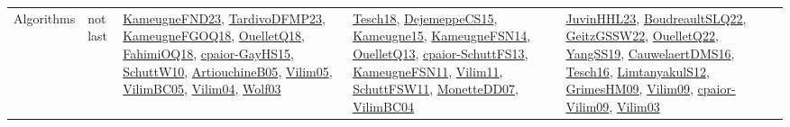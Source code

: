 {\begin{longtable}{llp{6cm}p{6cm}p{6cm}}
Algorithms & not last & \href{papers/KameugneFND23.pdf}{KameugneFND23}\cite{KameugneFND23}, \href{papers/TardivoDFMP23.pdf}{TardivoDFMP23}\cite{TardivoDFMP23}, \href{papers/KameugneFGOQ18.pdf}{KameugneFGOQ18}\cite{KameugneFGOQ18}, \href{papers/OuelletQ18.pdf}{OuelletQ18}\cite{OuelletQ18}, \href{articles/FahimiOQ18.pdf}{FahimiOQ18}\cite{FahimiOQ18}, \href{papers/cpaior-GayHS15.pdf}{cpaior-GayHS15}\cite{cpaior-GayHS15}, \href{papers/SchuttW10.pdf}{SchuttW10}\cite{SchuttW10}, \href{papers/ArtiouchineB05.pdf}{ArtiouchineB05}\cite{ArtiouchineB05}, \href{papers/Vilim05.pdf}{Vilim05}\cite{Vilim05}, \href{articles/VilimBC05.pdf}{VilimBC05}\cite{VilimBC05}, \href{papers/Vilim04.pdf}{Vilim04}\cite{Vilim04}, \href{papers/Wolf03.pdf}{Wolf03}\cite{Wolf03} & \href{papers/Tesch18.pdf}{Tesch18}\cite{Tesch18}, \href{papers/DejemeppeCS15.pdf}{DejemeppeCS15}\cite{DejemeppeCS15}, \href{articles/Kameugne15.pdf}{Kameugne15}\cite{Kameugne15}, \href{articles/KameugneFSN14.pdf}{KameugneFSN14}\cite{KameugneFSN14}, \href{papers/OuelletQ13.pdf}{OuelletQ13}\cite{OuelletQ13}, \href{papers/cpaior-SchuttFS13.pdf}{cpaior-SchuttFS13}\cite{cpaior-SchuttFS13}, \href{papers/KameugneFSN11.pdf}{KameugneFSN11}\cite{KameugneFSN11}, \href{papers/Vilim11.pdf}{Vilim11}\cite{Vilim11}, \href{articles/SchuttFSW11.pdf}{SchuttFSW11}\cite{SchuttFSW11}, \href{papers/MonetteDD07.pdf}{MonetteDD07}\cite{MonetteDD07}, \href{papers/VilimBC04.pdf}{VilimBC04}\cite{VilimBC04} & \href{papers/JuvinHHL23.pdf}{JuvinHHL23}\cite{JuvinHHL23}, \href{papers/BoudreaultSLQ22.pdf}{BoudreaultSLQ22}\cite{BoudreaultSLQ22}, \href{papers/GeitzGSSW22.pdf}{GeitzGSSW22}\cite{GeitzGSSW22}, \href{papers/OuelletQ22.pdf}{OuelletQ22}\cite{OuelletQ22}, \href{papers/YangSS19.pdf}{YangSS19}\cite{YangSS19}, \href{papers/CauwelaertDMS16.pdf}{CauwelaertDMS16}\cite{CauwelaertDMS16}, \href{papers/Tesch16.pdf}{Tesch16}\cite{Tesch16}, \href{articles/LimtanyakulS12.pdf}{LimtanyakulS12}\cite{LimtanyakulS12}, \href{papers/GrimesHM09.pdf}{GrimesHM09}\cite{GrimesHM09}, \href{papers/Vilim09.pdf}{Vilim09}\cite{Vilim09}, \href{papers/cpaior-Vilim09.pdf}{cpaior-Vilim09}\cite{cpaior-Vilim09}, \href{papers/Vilim03.pdf}{Vilim03}\cite{Vilim03}\\

\end{longtable}}
